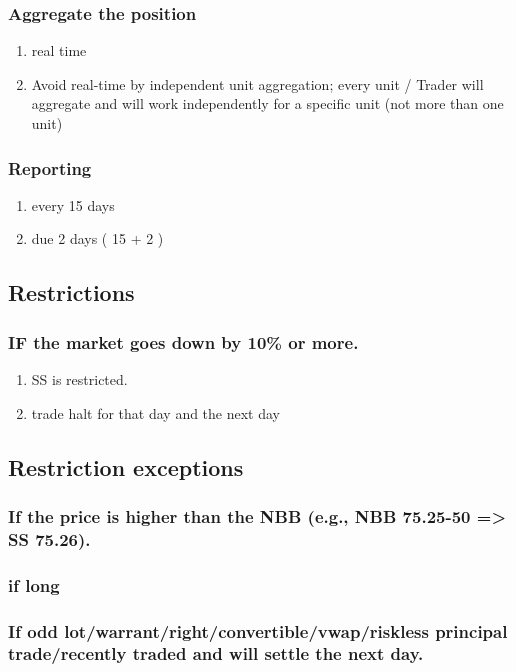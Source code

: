 \documentclass[11pt]{article}
\begin{document}
\subsubsection{Aggregate the position}
\label{sec:org0269c0e}
\begin{enumerate}
\item real time
\label{sec:orga0af724}
\item Avoid real-time by independent unit aggregation; every unit / Trader will aggregate and will work independently for a specific unit (not more than one unit)
\label{sec:org00203ea}
\end{enumerate}
\subsubsection{Reporting}
\label{sec:orgc7f7f24}
\begin{enumerate}
\item every 15 days
\label{sec:org5df294f}
\item due 2 days ( 15 + 2 )
\label{sec:org7ee564b}
\end{enumerate}
\subsection{Restrictions}
\label{sec:orgdccf028}
\subsubsection{IF the market goes down by 10\% or more.}
\label{sec:orgbfe4650}
\begin{enumerate}
\item SS is restricted.
\label{sec:org723b816}
\item trade halt for that day and the next day
\label{sec:orgee175c3}
\end{enumerate}
\subsection{Restriction exceptions}
\label{sec:orgf91698d}
\subsubsection{If the price is higher than the NBB  (e.g., NBB 75.25-50 => SS 75.26).}
\label{sec:orgb46e605}
\subsubsection{if long}
\label{sec:org6535f99}
\subsubsection{If odd lot/warrant/right/convertible/vwap/riskless principal trade/recently traded and will settle the next day.}
\label{sec:org2d7254c}
\end{document}
